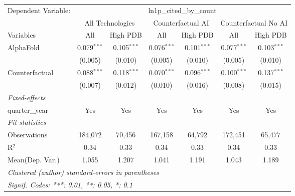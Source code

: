 \begingroup
\centering
\begin{tabular}{lcccccc}
   \tabularnewline \midrule \midrule
   Dependent Variable: & \multicolumn{6}{c}{ln1p\_cited\_by\_count}\\
 & \multicolumn{2}{c}{All Technologies} & \multicolumn{2}{c}{Counterfactual AI} & \multicolumn{2}{c}{Counterfactual No AI} \\
\cmidrule(lr){1-1}\cmidrule(lr){2-3} \cmidrule(lr){4-5} \cmidrule(lr){6-7}
Variables & \multicolumn{1}{c}{All} & \multicolumn{1}{c}{High PDB} & \multicolumn{1}{c}{All} & \multicolumn{1}{c}{High PDB} & \multicolumn{1}{c}{All} & \multicolumn{1}{c}{High PDB} \\
\cmidrule(lr){1-1}\cmidrule(lr){2-2} \cmidrule(lr){3-3} \cmidrule(lr){4-4} \cmidrule(lr){5-5} \cmidrule(lr){6-6} \cmidrule(lr){7-7}
   AlphaFold      & 0.079$^{***}$ & 0.105$^{***}$ & 0.076$^{***}$ & 0.101$^{***}$ & 0.077$^{***}$ & 0.103$^{***}$\\   
                  & (0.005)       & (0.010)       & (0.005)       & (0.010)       & (0.005)       & (0.010)\\   
   Counterfactual & 0.088$^{***}$ & 0.118$^{***}$ & 0.070$^{***}$ & 0.096$^{***}$ & 0.100$^{***}$ & 0.137$^{***}$\\   
                  & (0.007)       & (0.012)       & (0.010)       & (0.016)       & (0.008)       & (0.015)\\   
   \midrule
   \emph{Fixed-effects}\\
   quarter\_year  & Yes           & Yes           & Yes           & Yes           & Yes           & Yes\\  
   \midrule
   \emph{Fit statistics}\\
   Observations   & 184,072       & 70,456        & 167,158       & 64,792        & 172,451       & 65,477\\  
   R$^2$          & 0.34          & 0.33          & 0.34          & 0.33          & 0.34          & 0.33\\  
Mean(Dep. Var.) & 1.055 & 1.207 & 1.041 & 1.191 & 1.043 & 1.189 \\
   \midrule \midrule
   \multicolumn{7}{l}{\emph{Clustered (author) standard-errors in parentheses}}\\
   \multicolumn{7}{l}{\emph{Signif. Codes: ***: 0.01, **: 0.05, *: 0.1}}\\
\end{tabular}
\par\endgroup
